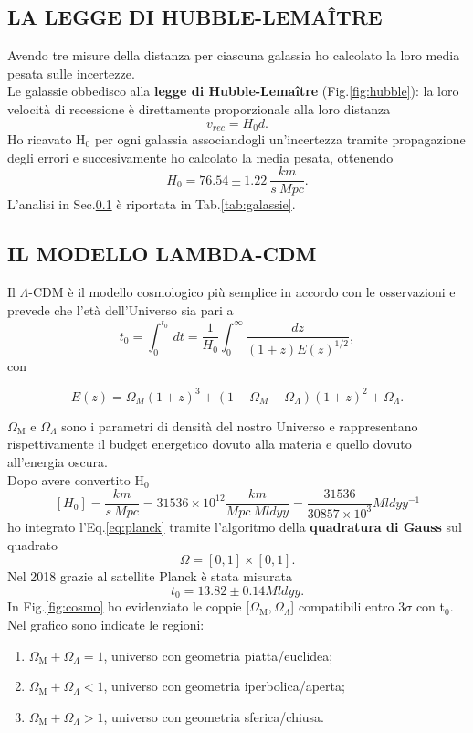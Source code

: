 \documentclass{article}
\numberwithin{equation}{subsection}
\begin{document}
\subsection{LA LEGGE DI HUBBLE-LEMAÎTRE} \label{sec:hubble}
\vspace{0.2 cm}
Avendo tre misure della distanza per ciascuna galassia ho calcolato la loro media pesata sulle incertezze.\\
Le galassie obbedisco alla \textbf{legge di Hubble-Lemaître} (Fig.\ref{fig:hubble}): la loro velocità di recessione è direttamente proporzionale alla loro distanza
\begin{equation} \label{eq:hubble}
    v_{rec}=H_0d.        
\end{equation}
Ho ricavato H$_0$ per ogni galassia associandogli un'incertezza tramite propagazione degli errori e succesivamente ho calcolato la media pesata, ottenendo
$$H_0=76.54\pm1.22 \ \frac{km}{s \ Mpc}.$$
L'analisi in Sec.\ref{sec:hubble} è riportata in Tab.\ref{tab:galassie}.

\subsection{IL MODELLO LAMBDA-CDM}
\vspace{0.2 cm}
Il $\Lambda$-CDM è il modello cosmologico più semplice in accordo con le osservazioni e prevede che l'età dell'Universo sia pari a 
\begin{equation} \label{eq:planck}
    t_0=\int_{0}^{t_0} \, dt = \frac{1}{H_0}\int_{0}^{\infty} \frac{dz}{(1+z)E(z)^{1/2}},   
\end{equation}con

    $$E(z)=\Omega_M(1+z)^3+(1-\Omega_M-\Omega_{\Lambda})(1+z)^2+\Omega_{\Lambda}.$$

$\Omega_{\mathrm{M}}$ e $\Omega_{\Lambda}$ sono i parametri di densità del nostro Universo e rappresentano rispettivamente il budget energetico dovuto alla materia e quello dovuto all'energia oscura.\\
Dopo avere convertito H$_0$
\begin{equation}\label{eq:miliardi}
    [H_0]=\frac{km}{s \ Mpc}=31536\times10^{12}\frac{km}{Mpc \ Mldyy}=\frac{31536}{30857\times10^3}Mldyy^{-1}
\end{equation}
ho integrato l'Eq.\ref{eq:planck} tramite l'algoritmo della \textbf{quadratura di Gauss} sul quadrato
$$\Omega=[0,1]\times[0,1].$$
Nel 2018 grazie al satellite Planck è stata misurata
$$t_0=13.82\pm0.14 Mld yy.$$
In Fig.\ref{fig:cosmo} ho evidenziato le coppie [$\Omega_{\mathrm{M}},\Omega_{\Lambda}$] compatibili entro 3$\sigma$ con t$_0$. Nel grafico sono indicate le regioni:
\begin{enumerate}
    \item $\Omega_{\mathrm{M}} + \Omega_{\Lambda}=1$, universo con geometria piatta/euclidea;
    \item $\Omega_{\mathrm{M}} + \Omega_{\Lambda}<1$, universo con geometria iperbolica/aperta;
    \item $\Omega_{\mathrm{M}} + \Omega_{\Lambda}>1$, universo con geometria sferica/chiusa.
\end{enumerate}
\end{document}
